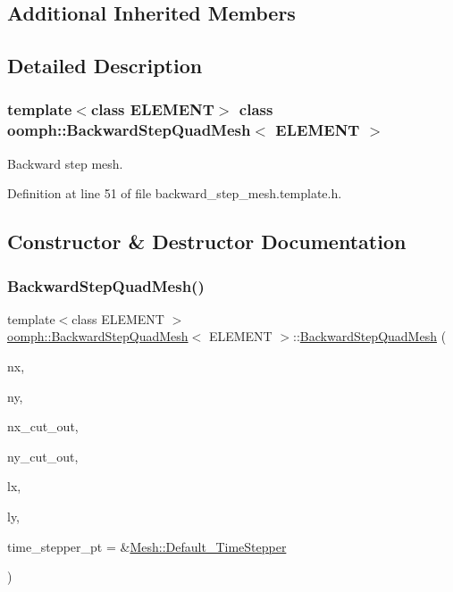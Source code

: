 \subsection*{Additional Inherited Members}


\subsection{Detailed Description}
\subsubsection*{template$<$class E\+L\+E\+M\+E\+NT$>$\newline
class oomph\+::\+Backward\+Step\+Quad\+Mesh$<$ E\+L\+E\+M\+E\+N\+T $>$}

Backward step mesh. 

Definition at line 51 of file backward\+\_\+step\+\_\+mesh.\+template.\+h.



\subsection{Constructor \& Destructor Documentation}
\mbox{\label{classoomph_1_1BackwardStepQuadMesh_ae8374ae7d3646c00fec4fc9c2d604cf8}} 
\subsubsection{\texorpdfstring{Backward\+Step\+Quad\+Mesh()}{BackwardStepQuadMesh()}}
{\footnotesize\ttfamily template$<$class E\+L\+E\+M\+E\+NT $>$ \\
\hyperlink{classoomph_1_1BackwardStepQuadMesh}{oomph\+::\+Backward\+Step\+Quad\+Mesh}$<$ E\+L\+E\+M\+E\+NT $>$\+::\hyperlink{classoomph_1_1BackwardStepQuadMesh}{Backward\+Step\+Quad\+Mesh} (\begin{DoxyParamCaption}\item[{const unsigned \&}]{nx,  }\item[{const unsigned \&}]{ny,  }\item[{const unsigned \&}]{nx\+\_\+cut\+\_\+out,  }\item[{const unsigned \&}]{ny\+\_\+cut\+\_\+out,  }\item[{const double \&}]{lx,  }\item[{const double \&}]{ly,  }\item[{\hyperlink{classoomph_1_1TimeStepper}{Time\+Stepper} $\ast$}]{time\+\_\+stepper\+\_\+pt = {\ttfamily \&\hyperlink{classoomph_1_1Mesh_a12243d0fee2b1fcee729ee5a4777ea10}{Mesh\+::\+Default\+\_\+\+Time\+Stepper}} }\end{DoxyParamCaption})\hspace{0.3cm}{\ttfamily [inline]}}



